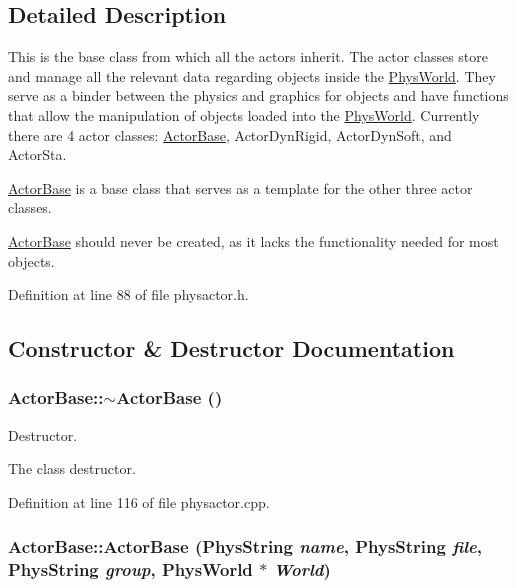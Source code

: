 \subsection{Detailed Description}
This is the base class from which all the actors inherit. The actor classes store and manage all the relevant data regarding objects inside the \hyperlink{classPhysWorld}{PhysWorld}. They serve as a binder between the physics and graphics for objects and have functions that allow the manipulation of objects loaded into the \hyperlink{classPhysWorld}{PhysWorld}. Currently there are 4 actor classes: \hyperlink{classActorBase}{ActorBase}, ActorDynRigid, ActorDynSoft, and ActorSta. \par
 \hyperlink{classActorBase}{ActorBase} is a base class that serves as a template for the other three actor classes. \par
 \hyperlink{classActorBase}{ActorBase} should never be created, as it lacks the functionality needed for most objects. 

Definition at line 88 of file physactor.h.



\subsection{Constructor \& Destructor Documentation}
\hypertarget{classActorBase_a6fd984c46b3232c2522adb44be4dedb7}{
\subsubsection[{$\sim$ActorBase}]{\setlength{\rightskip}{0pt plus 5cm}ActorBase::$\sim$ActorBase ()}}
\label{dd/d7b/classActorBase_a6fd984c46b3232c2522adb44be4dedb7}


Destructor. 

The class destructor. 

Definition at line 116 of file physactor.cpp.

\hypertarget{classActorBase_a673d963aa7a99475cb03250c010dfa15}{
\subsubsection[{ActorBase}]{\setlength{\rightskip}{0pt plus 5cm}ActorBase::ActorBase (PhysString {\em name}, \/  PhysString {\em file}, \/  PhysString {\em group}, \/  {\bf PhysWorld} $\ast$ {\em World})}}
\label{dd/d7b/classActorBase_a673d963aa7a99475cb03250c010dfa15}


